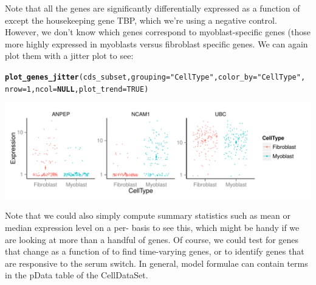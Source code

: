 \documentclass[10pt,oneside]{article}\usepackage[]{graphicx}\usepackage[]{color}
\makeatletter
\def\maxwidth{ %
  \ifdim\Gin@nat@width>\linewidth
    \linewidth
  \else
    \Gin@nat@width
  \fi
}
\newcommand{\hlnum}[1]{\textcolor[rgb]{0.686,0.059,0.569}{#1}}%
\newcommand{\hlstr}[1]{\textcolor[rgb]{0.192,0.494,0.8}{#1}}%
\newcommand{\hlstd}[1]{\textcolor[rgb]{0.345,0.345,0.345}{#1}}%
\newcommand{\hlkwa}[1]{\textcolor[rgb]{0.161,0.373,0.58}{\textbf{#1}}}%
\newcommand{\hlkwc}[1]{\textcolor[rgb]{0.333,0.667,0.333}{#1}}%
\newcommand{\hlkwd}[1]{\textcolor[rgb]{0.737,0.353,0.396}{\textbf{#1}}}%
\newenvironment{kframe}{%
 \def\at@end@of@kframe{}%
 \ifinner\ifhmode%
  \def\at@end@of@kframe{\end{minipage}}%
  \begin{minipage}{\columnwidth}%
 \fi\fi%
 \def\FrameCommand##1{\hskip\@totalleftmargin \hskip-\fboxsep
 \colorbox{shadecolor}{##1}\hskip-\fboxsep
     \hskip-\linewidth \hskip-\@totalleftmargin \hskip\columnwidth}%
 \MakeFramed {\advance\hsize-\width
   \@totalleftmargin\z@ \linewidth\hsize
   \@setminipage}}%
 {\par\unskip\endMakeFramed%
 \at@end@of@kframe}
\newenvironment{knitrout}{}{} %
\makeatother
\begin{document}
Note that all the genes are significantly differentially expressed as a function of  except the housekeeping gene TBP, which we're using a negative control.  However, we don't know which genes correspond to myoblast-specific genes (those more highly expressed in myoblasts versus fibroblast specific genes.  We can again plot them with a jitter plot to see:

\begin{knitrout}
\color{fgcolor}\begin{kframe}
\begin{alltt}
\hlkwd{plot_genes_jitter}\hlstd{(cds_subset,} \hlkwc{grouping}\hlstd{=}\hlstr{"CellType"}\hlstd{,} \hlkwc{color_by}\hlstd{=}\hlstr{"CellType"}\hlstd{,}
                  \hlkwc{nrow}\hlstd{=}\hlnum{1}\hlstd{,} \hlkwc{ncol}\hlstd{=}\hlkwa{NULL}\hlstd{,} \hlkwc{plot_trend}\hlstd{=}\hlnum{TRUE}\hlstd{)}
\end{alltt}


{\ttfamily\noindent\itshape\color{messagecolor}{\#\# geom\_path: Each group consist of only one observation. Do you need to adjust the group aesthetic?\\\#\# geom\_path: Each group consist of only one observation. Do you need to adjust the group aesthetic?\\\#\# geom\_path: Each group consist of only one observation. Do you need to adjust the group aesthetic?}}\end{kframe}

{\centering \includegraphics[width=\maxwidth]{figure/jitter_plot_diff_res-1} 

}



\end{knitrout}

Note that we could also simply compute summary statistics such as mean or median expression level on a per- basis to see this, which might be handy if we are looking at more than a handful of genes. Of course, we could test for genes that change as a function of  to find time-varying genes, or  to identify genes that are responsive to the serum switch.  In general, model formulae can contain terms in the pData table of the CellDataSet. 
\end{document}
